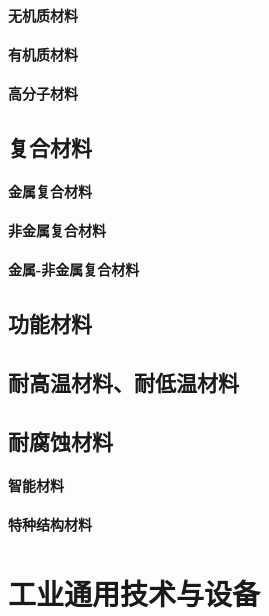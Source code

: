 \documentclass[UTF8]{../../ApplicationUniverse}
\begin{document}
    \subsubsection{无机质材料}
    \subsubsection{有机质材料}
    \subsubsection{高分子材料}
\section{复合材料}
    \subsubsection{金属复合材料}
    \subsubsection{非金属复合材料}
    \subsubsection{金属-非金属复合材料}
\section{功能材料}
\section{耐高温材料、耐低温材料}
\section{耐腐蚀材料}
    \subsubsection{智能材料}
    \subsubsection{特种结构材料}










\chapter{工业通用技术与设备}
\end{document}
